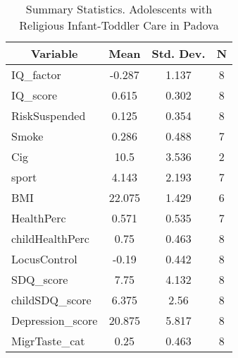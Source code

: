 
\begin{table}[htbp]\centering \caption{Summary Statistics. Adolescents with Religious Infant-Toddler Care in Padova \label{bothAdolasiloReliPadova}}
\begin{tabular}{l c c  c}\hline\hline
\multicolumn{1}{c}{\textbf{Variable}} & \textbf{Mean}
 & \textbf{Std. Dev.} & \textbf{N}\\ \hline
IQ\_factor & -0.287 & 1.137  & 8\\
IQ\_score & 0.615 & 0.302  & 8\\
RiskSuspended & 0.125 & 0.354  & 8\\
Smoke & 0.286 & 0.488  & 7\\
Cig & 10.5 & 3.536  & 2\\
sport & 4.143 & 2.193  & 7\\
BMI & 22.075 & 1.429  & 6\\
HealthPerc & 0.571 & 0.535  & 7\\
childHealthPerc & 0.75 & 0.463  & 8\\
LocusControl & -0.19 & 0.442  & 8\\
SDQ\_score & 7.75 & 4.132  & 8\\
childSDQ\_score & 6.375 & 2.56  & 8\\
Depression\_score & 20.875 & 5.817  & 8\\
MigrTaste\_cat & 0.25 & 0.463  & 8\\
\hline\end{tabular}
\end{table}
